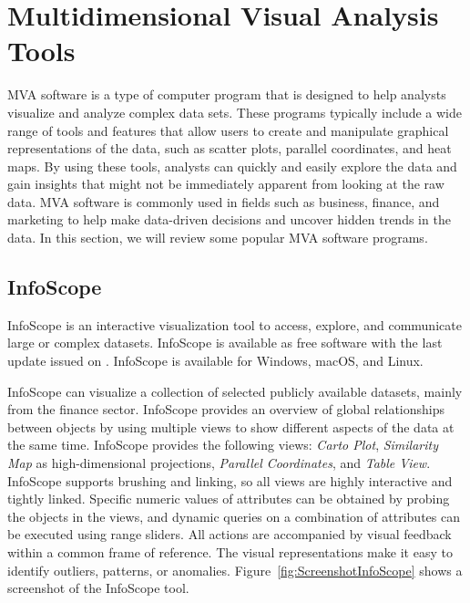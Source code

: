 
\chapter{Multidimensional Visual Analysis Tools}

\label{chap:MVATools}

MVA software is a type of computer program that is designed to help
analysts visualize and analyze complex data sets. These programs
typically include a wide range of tools and features that allow users
to create and manipulate graphical representations of the data, such
as scatter plots, parallel coordinates, and heat maps. By using these
tools, analysts can quickly and easily explore the data and gain
insights that might not be immediately apparent from looking at the
raw data. MVA software is commonly used in fields such as business,
finance, and marketing to help make data-driven decisions and uncover
hidden trends in the data. In this section, we will review some
popular MVA software programs.




\section{InfoScope}

InfoScope \parencite{InfoScope} is an interactive visualization tool
to access, explore, and communicate large or complex
datasets. InfoScope is available as free software with the last update
issued on . InfoScope is available for Windows, 
macOS, and Linux.

InfoScope can visualize a collection of selected publicly available datasets,
mainly from the finance sector. InfoScope provides an overview of global
relationships between objects by using multiple views to show different aspects
of the data at the same time. InfoScope provides the following views:
\emph{Carto Plot}, \emph{Similarity Map} as high-dimensional projections,
\emph{Parallel Coordinates}, and \emph{Table View}. InfoScope supports brushing
and linking, so all views are highly interactive and tightly linked. Specific
numeric values of attributes can be obtained by probing the objects in the
views, and dynamic queries on a combination of attributes can be executed using
range sliders. All actions are accompanied by visual feedback within a common
frame of reference. The visual representations make it easy to identify
outliers, patterns, or anomalies. Figure~\ref{fig:ScreenshotInfoScope} shows a
screenshot of the InfoScope tool.




